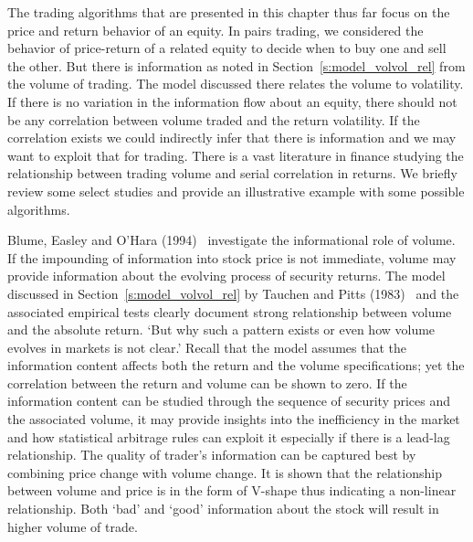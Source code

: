 The trading algorithms that are presented in this chapter thus far focus on the price and return behavior of an equity. In pairs trading, we considered the behavior of price-return of a related equity to decide when to buy one and sell the other. But there is information as noted in Section~\ref{s:model_volvol_rel} from the volume of trading. The model discussed there relates the volume to volatility. If there is no variation in the information flow about an equity, there should not be any correlation between volume traded and the return volatility. If the correlation exists we could indirectly infer that there is information and we may want to exploit that for trading. There is a vast literature in finance studying the relationship between trading volume and serial correlation in returns. We briefly review some select studies and provide an illustrative example with some possible algorithms. 


Blume, Easley and O'Hara (1994)~\cite{blumeohar} investigate the informational role of volume. If the impounding of information into stock price is not immediate, volume may provide information about the evolving process of security returns. The model discussed in Section~\ref{s:model_volvol_rel} by Tauchen and Pitts (1983)~\cite{tauchenpitts} and the associated empirical tests clearly document strong relationship between volume and the absolute return. `But why such a pattern exists or even how volume evolves in markets is not clear.' Recall that the model assumes that the information content affects both the return and the volume specifications; yet the correlation between the return and volume can be shown to zero. If the information content can be studied through the sequence of security prices and the associated volume, it may provide insights into the inefficiency in the market and how statistical arbitrage rules can exploit it especially if there is a lead-lag relationship. The quality of trader's information can be captured best by combining price change with volume change. It is shown that the relationship between volume and price is in the form of V-shape thus indicating a non-linear relationship. Both `bad' and `good' information about the stock will result in higher volume of trade. 


